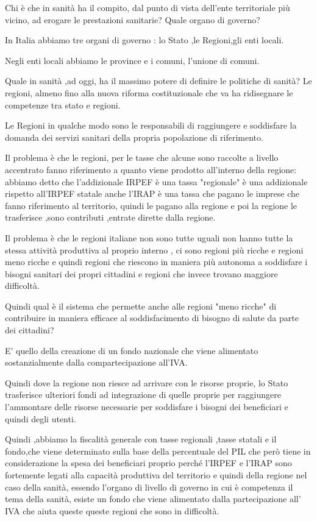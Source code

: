 \documentclass[]{article}
\begin{document}
Chi è che in sanità ha il compito, dal punto di vista dell'ente
territoriale più vicino, ad erogare le prestazioni sanitarie? Quale
organo di governo?

In Italia abbiamo tre organi di governo : lo Stato ,le Regioni,gli enti
locali.

Negli enti locali abbiamo le province e i comuni, l'unione di comuni.

Quale in sanità ,ad oggi, ha il massimo potere di definire le politiche
di sanità? Le regioni, almeno fino alla nuova riforma costituzionale che
va ha ridisegnare le competenze tra stato e regioni.

Le Regioni in qualche modo sono le responsabili di raggiungere e
soddisfare la domanda dei servizi sanitari della propria popolazione di
riferimento.

Il problema è che le regioni, per le tasse che alcune sono raccolte a
livello accentrato fanno riferimento a quanto viene prodotto all'interno
della regione: abbiamo detto che l'addizionale IRPEF è una tassa
"regionale" è una addizionale rispetto all'IRPEF statale anche l'IRAP è
una tassa che pagano le imprese che fanno riferimento al territorio,
quindi le pagano alla regione e poi la regione le trasferisce ,sono
contributi ,entrate dirette dalla regione.

Il problema è che le regioni italiane non sono tutte uguali non hanno
tutte la stessa attività produttiva al proprio interno , ci sono regioni
più ricche e regioni meno ricche e quindi regioni che riescono in
maniera più autonoma a soddisfare i bisogni sanitari dei propri
cittadini e regioni che invece trovano maggiore difficoltà.

Quindi qual è il sistema che permette anche alle regioni "meno ricche"
di contribuire in maniera efficace al soddisfacimento di bisogno di
salute da parte dei cittadini?

E' quello della creazione di un fondo nazionale che viene alimentato
sostanzialmente dalla compartecipazione all'IVA.

Quindi dove la regione non riesce ad arrivare con le risorse proprie, lo
Stato trasferisce ulteriori fondi ad integrazione di quelle proprie per
raggiungere l'ammontare delle risorse necessarie per soddisfare i
bisogni dei beneficiari e quindi degli utenti.

Quindi ,abbiamo la fiscalità generale con tasse regionali ,tasse statali
e il fondo,che viene determinato sulla base della percentuale del PIL
che però tiene in considerazione la spesa dei beneficiari proprio perché
l'IRPEF e l'IRAP sono fortemente legati alla capacità produttiva del
territorio e quindi della regione nel caso della sanità, essendo
l'organo di livello di governo in cui è competenza il tema della sanità,
esiste un fondo che viene alimentato dalla partecipazione all' IVA che
aiuta queste queste regioni che sono in difficoltà.
\end{document}

